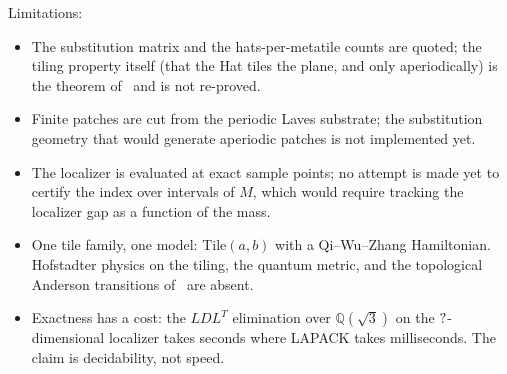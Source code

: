 \documentclass[11pt,a4paper]{article}
\newcommand{\QQ}{\mathbb{Q}}
\theoremstyle{definition}
\begin{document}
Limitations:
%
\begin{itemize}[leftmargin=2em,itemsep=1pt]
\item The substitution matrix and the hats-per-metatile counts are quoted;
the tiling property itself (that the Hat tiles the plane, and only
aperiodically) is the theorem of~\cite{Smith2023a} and is not re-proved.
\item Finite patches are cut from the periodic Laves substrate; the
substitution geometry that would generate aperiodic patches is not
implemented yet.
\item The localizer is evaluated at exact sample points; no attempt is made yet
to certify the index over intervals of $M$, which would require tracking
the localizer gap as a function of the mass.
\item One tile family, one model: Tile$(a,b)$ with a Qi--Wu--Zhang
Hamiltonian. Hofstadter physics on the tiling, the quantum metric, and the
topological Anderson transitions of~\cite{RocheCarrasco2025} are absent.
\item Exactness has a cost: the $LDL^T$ elimination over $\QQ(\sqrt3)$ on
the $?$-dimensional localizer takes seconds where LAPACK takes
milliseconds. The claim is decidability, not speed.
\end{itemize}

\end{document}
